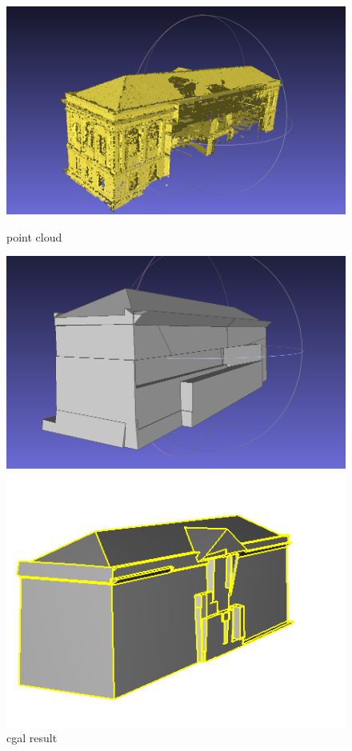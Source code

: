 \documentclass{article}
\begin{document}
\vspace{0.5cm}
\begin{figure}[H]
  \centering
  \begin{minipage}[t]{0.29\textwidth}
  \includegraphics[width=\textwidth]{../../images/screen_kinetic/building_point.png}
  \caption*{point cloud}
\end{minipage}
  \begin{minipage}[t]{0.29\textwidth}
  \includegraphics[width=\textwidth]{../../images/screen_kinetic/building_cgal.png}
  \caption*{cgal result}
\end{minipage}
  \begin{minipage}[t]{0.29\textwidth}
  \includegraphics[width=\textwidth]{../../images/screen_kinetic/building_inria.png}

\end{minipage}
\end{figure}
\end{document}
